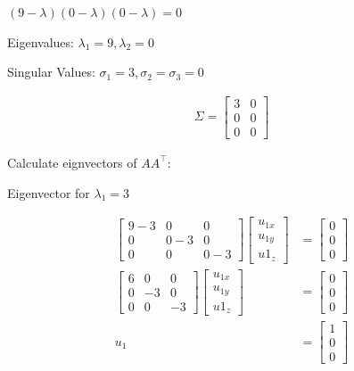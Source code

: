 \documentclass[11pt,letterpaper]{article}
\begin{document}
\begin{enumerate}
\( (9 - \lambda)(0 - \lambda)(0 - \lambda) = 0 \)

Eigenvalues: \( \lambda_1 = 9, \lambda_2 = 0 \)

Singular Values: \( \sigma_1 = 3, \sigma_2 = \sigma_3 = 0 \)

\begin{align*}
\Sigma = {\begin{bmatrix}
        3 & 0 \\
        0 & 0 \\
        0 & 0
    \end{bmatrix}}
\end{align*}

Calculate eignvectors of \( AA^\top \):

Eigenvector for \( \lambda_1 = 3 \)

\begin{align*}
    \begin{bmatrix}
        9-3 & 0 & 0 \\
        0 & 0-3 & 0 \\
        0 & 0 & 0-3
    \end{bmatrix}
    \begin{bmatrix}
        u_{1x} \\ u_{1y} \\ u1_z
    \end{bmatrix}
    &= \begin{bmatrix}
        0 \\ 0 \\ 0
    \end{bmatrix} \\
    \begin{bmatrix}
        6 & 0 & 0 \\
        0 & -3 & 0 \\
        0 & 0 & -3
    \end{bmatrix}
    \begin{bmatrix}
        u_{1x} \\ u_{1y} \\ u1_z
    \end{bmatrix}
    &= \begin{bmatrix}
        0 \\ 0 \\ 0
    \end{bmatrix} \\
    u_1
    &= \begin{bmatrix}
        1 \\ 0 \\ 0
    \end{bmatrix}
\end{align*}


\end{enumerate}
\end{document}

